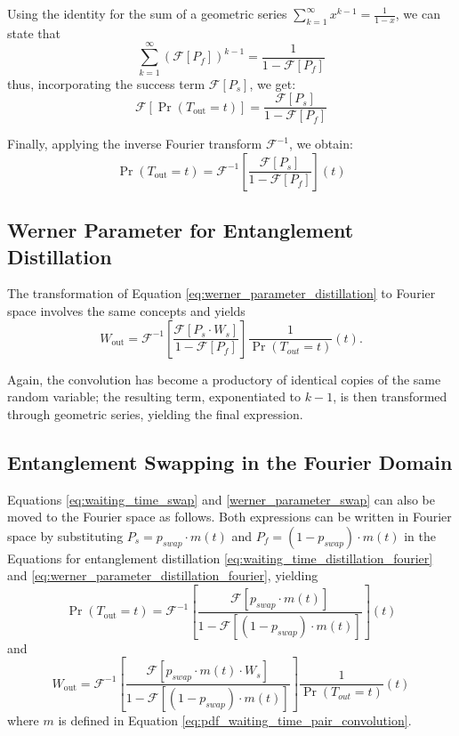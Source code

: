 \documentclass{masterthesis}
\begin{document}
Using the identity for the sum of a geometric series \(\sum_{k=1}^{\infty} x^{k-1} = \frac{1}{1-x}\), we can state that
\begin{equation}
    \sum_{k=1}^{\infty} \left( \mathcal{F}[P_f] \right)^{k-1} = \frac{1}{1 - \mathcal{F}[P_f]}
\end{equation}
thus, incorporating the success term \(\mathcal{F}[P_s]\), we get:
\begin{equation}
\mathcal{F}[\Pr(T_{\text{out}} = t)] = \frac{\mathcal{F}[P_s]}{1 - \mathcal{F}[P_f]}
\end{equation}

Finally, applying the inverse Fourier transform \(\mathcal{F}^{-1}\), we obtain:
\begin{equation}
    \Pr(T_{\text{out}} = t) = \mathcal{F}^{-1} \left[ \frac{\mathcal{F}[P_s]}{1 - \mathcal{F}[P_f]} \right](t)
\end{equation}

\subsection*{Werner Parameter for Entanglement Distillation}

The transformation of Equation \ref{eq:werner_parameter_distillation} to Fourier space involves the same concepts and yields
\begin{equation}\label{eq:werner_parameter_distillation_fourier}
    W_{\text{out}} = \mathcal{F}^{-1} \left[ \frac{\mathcal{F}[P_s \cdot W_s]}{1 - \mathcal{F}[P_f]} \right] \frac{1}{\Pr(T_{out}=t)}(t) .
\end{equation}

Again, the convolution has become a productory of identical copies of the same random variable; the resulting term, exponentiated to $k-1$, is then transformed through geometric series, yielding the final expression.

\subsection*{Entanglement Swapping in the Fourier Domain}

Equations \ref{eq:waiting_time_swap} and \ref{werner_parameter_swap} can also be moved to the Fourier space as follows.
Both expressions can be written in Fourier space by substituting $P_s = p_{swap} \cdot m(t)$ and $P_f = (1 - p_{swap}) \cdot m(t)$ in the Equations for entanglement distillation \ref{eq:waiting_time_distillation_fourier} and \ref{eq:werner_parameter_distillation_fourier}, yielding
\begin{equation}
    \Pr(T_{\text{out}} = t) = \mathcal{F}^{-1} \left[ \frac{\mathcal{F}[p_{swap} \cdot m(t)]}{1 - \mathcal{F}[(1 - p_{swap}) \cdot m(t)]} \right](t)
\end{equation}
and
\begin{equation}
    W_{\text{out}} = \mathcal{F}^{-1} \left[ \frac{\mathcal{F}[p_{swap} \cdot m(t) \cdot W_s]}{1 - \mathcal{F}[(1 - p_{swap}) \cdot m(t)]} \right] \frac{1}{\Pr(T_{out}=t)}(t)
\end{equation}
where $m$ is defined in Equation \ref{eq:pdf_waiting_time_pair_convolution}.
\end{document}
